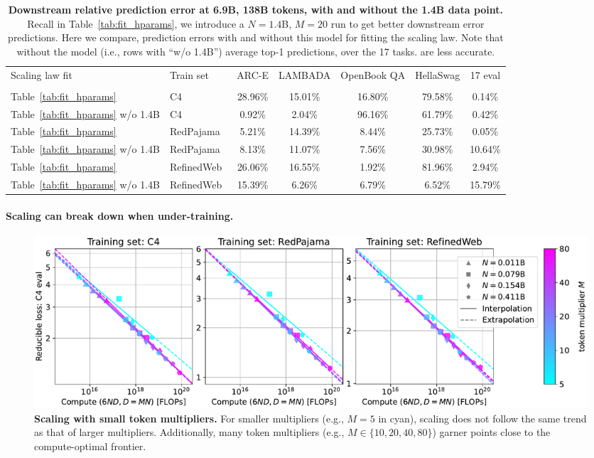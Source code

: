 \begin{appendix}
\begin{table}[tp]
    \centering
    \footnotesize
    \caption{
    \textbf{Downstream relative prediction error at 6.9B, 138B tokens, with and without the 1.4B data point.}
    Recall in Table~\ref{tab:fit_hparams}, we introduce a $N=1.4$B, $M=20$ run to get better downstream error predictions.
    Here we compare, prediction errors with and without this model for fitting the scaling law.
    Note that without the model (i.e., rows with ``w/o 1.4B'') average top-1 predictions, over the 17 tasks. are less accurate.
    }    
    \begin{tabular}{ll|cccc|c}
        \toprule
         Scaling law fit & Train set & ARC-E & LAMBADA & OpenBook QA & HellaSwag & 17 eval  \\
          & & \cite{arc} & \cite{lambada} & \cite{OpenBookQA2018} & \cite{hellaswag} &  \\         
         \midrule
        Table~\ref{tab:fit_hparams} & C4~\cite{c4,c4_ai2} & 28.96\% &15.01\% &16.80\% &79.58\% &0.14\% \\
        Table~\ref{tab:fit_hparams} w/o 1.4B & C4~\cite{c4,c4_ai2} & 0.92\% &2.04\% &96.16\% &61.79\% &0.42\% \\\midrule
        Table~\ref{tab:fit_hparams} & RedPajama~\cite{rpj} & 5.21\% &14.39\% &8.44\% &25.73\% &0.05\% \\
        Table~\ref{tab:fit_hparams} w/o 1.4B & RedPajama~\cite{rpj} & 8.13\% &11.07\% &7.56\% &30.98\% &10.64\% \\\midrule
        Table~\ref{tab:fit_hparams} & RefinedWeb~\cite{refinedweb} & 26.06\% &16.55\% &1.92\% &81.96\% &2.94\% \\
        Table~\ref{tab:fit_hparams} w/o 1.4B & RefinedWeb~\cite{refinedweb} & 15.39\% &6.26\% &6.79\% &6.52\% &15.79\% \\
        \midrule
    \end{tabular}
    \label{tab:downstream_wo}
\end{table}

\paragraph{Scaling can break down when under-training.}

\begin{figure}[tp]
    \centering
    \includegraphics[width=\linewidth]{figs/emperical_small.pdf}
    \caption{\textbf{Scaling with small token multipliers.} For smaller multipliers (e.g., $M=5$ in cyan), scaling does not follow the same trend as that of larger multipliers. Additionally, many token multipliers (e.g., $M \in \{10, 20, 40, 80\}$) garner points close to the compute-optimal frontier.}
    \label{fig:emperical_small}
\end{figure}


\end{appendix}
